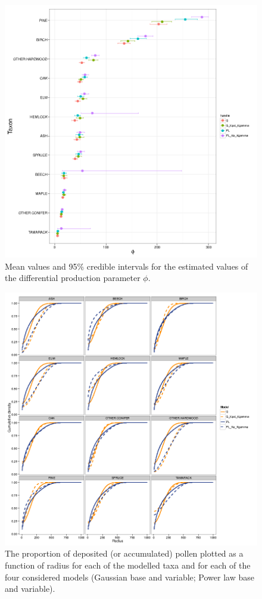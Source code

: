 \begin{figure}
\centering
\includegraphics[width=7in]{figures/phi.png}
\caption{Mean values and 95\% credible intervals for the estimated
  values of the differential production parameter $\phi$.}
\label{fig:phi}
\end{figure}

\begin{figure}
\centering
\includegraphics[width=7in]{figures/kernel_discrete_cdfs.png}
\caption{The proportion of deposited (or accumulated) pollen plotted
  as a function of radius for each of the modelled taxa and for each
  of the four considered models (Gaussian base and variable; Power law
  base and variable).}
\label{fig:cdf}
\end{figure}

